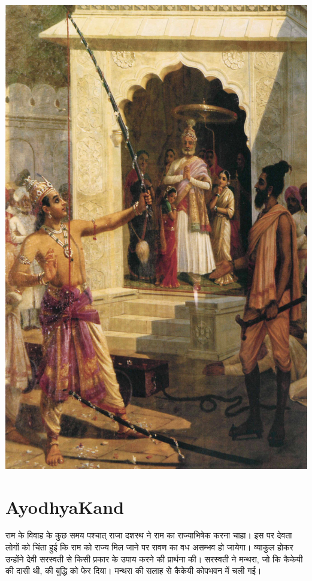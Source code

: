\documentclass[makeidx, 10pt, oneside, onecolumn, openright, final, svgnames, dvipsnames, extrafontsizes]{memoir}
\begin{document}
 \begin{center}
\includegraphics[scale=0.05]{Ravi_Varma-Rama-breaking-bow.jpg}
\end{center}



\chapter[अयोध्याकाण्ड]{AyodhyaKand}
\thispagestyle{empty}


\hspace{5mm}राम के विवाह के कुछ समय पश्चात् राजा दशरथ ने राम का राज्याभिषेक करना चाहा। इस पर देवता लोगों को चिंता हुई कि राम को राज्य मिल जाने पर रावण का वध असम्भव हो जायेगा। व्याकुल होकर उन्होंने देवी सरस्वती से किसी प्रकार के उपाय करने की प्रार्थना की। सरस्वती ने मन्थरा, जो कि कैकेयी की दासी थी, की बुद्धि को फेर दिया। मन्थरा की सलाह से कैकेयी कोपभवन में चली गई। 
\end{document}
